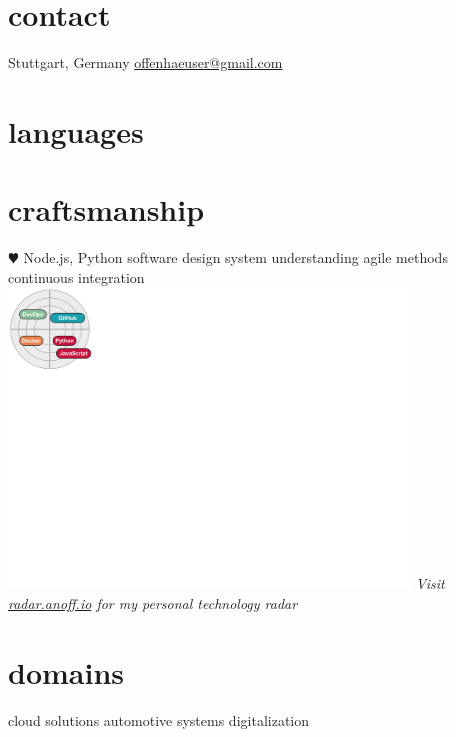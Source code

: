 \documentclass[]{friggeri-cv} %
\begin{document}


\begin{aside} %
\section{\color{red}contact}
Stuttgart, Germany
\href{mailto:offenhaeuser@gmail.com}{offenhaeuser@gmail.com}
\section{\color{purple}languages}
\section{\color{green}craftsmanship}
{\color{red} $\varheartsuit$} Node.js, Python
software design
system understanding
agile methods
continuous integration
\hfill
\includegraphics[clip, width=0.8\textwidth, trim=0cm 19cm 28cm 0cm]{radar.pdf}
\textit{Visit \href{https://radar.anoff.io}{radar.anoff.io} for my personal technology radar}
\section{\color{blue}domains}
cloud solutions
automotive systems
digitalization
\end{aside}
\end{document}
